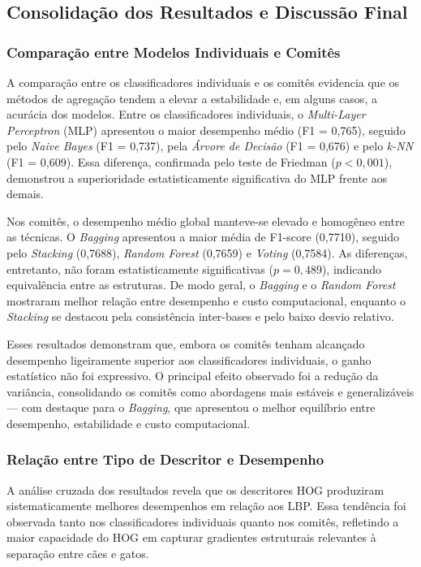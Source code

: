 \documentclass[12pt]{article}
\begin{document}
\subsection{Consolidação dos Resultados e Discussão Final}

\subsubsection{Comparação entre Modelos Individuais e Comitês}

A comparação entre os classificadores individuais e os comitês evidencia que os métodos de agregação tendem a elevar a estabilidade e, em alguns casos, a acurácia dos modelos. Entre os classificadores individuais, o \textit{Multi-Layer Perceptron} (MLP) apresentou o maior desempenho médio (F1 = 0,765), seguido pelo \textit{Naive Bayes} (F1 = 0,737), pela \textit{Árvore de Decisão} (F1 = 0,676) e pelo \textit{k-NN} (F1 = 0,609). Essa diferença, confirmada pelo teste de Friedman ($p < 0{,}001$), demonstrou a superioridade estatisticamente significativa do MLP frente aos demais.

Nos comitês, o desempenho médio global manteve-se elevado e homogêneo entre as técnicas. O \textit{Bagging} apresentou a maior média de F1-score (0,7710), seguido pelo \textit{Stacking} (0,7688), \textit{Random Forest} (0,7659) e \textit{Voting} (0,7584). As diferenças, entretanto, não foram estatisticamente significativas ($p = 0{,}489$), indicando equivalência entre as estruturas. De modo geral, o \textit{Bagging} e o \textit{Random Forest} mostraram melhor relação entre desempenho e custo computacional, enquanto o \textit{Stacking} se destacou pela consistência inter-bases e pelo baixo desvio relativo.

Esses resultados demonstram que, embora os comitês tenham alcançado desempenho ligeiramente superior aos classificadores individuais, o ganho estatístico não foi expressivo. O principal efeito observado foi a redução da variância, consolidando os comitês como abordagens mais estáveis e generalizáveis — com destaque para o \textit{Bagging}, que apresentou o melhor equilíbrio entre desempenho, estabilidade e custo computacional.


\subsubsection{Relação entre Tipo de Descritor e Desempenho}

A análise cruzada dos resultados revela que os descritores HOG produziram sistematicamente melhores desempenhos em relação aos LBP. Essa tendência foi observada tanto nos classificadores individuais quanto nos comitês, refletindo a maior capacidade do HOG em capturar gradientes estruturais relevantes à separação entre cães e gatos. 
\end{document}
